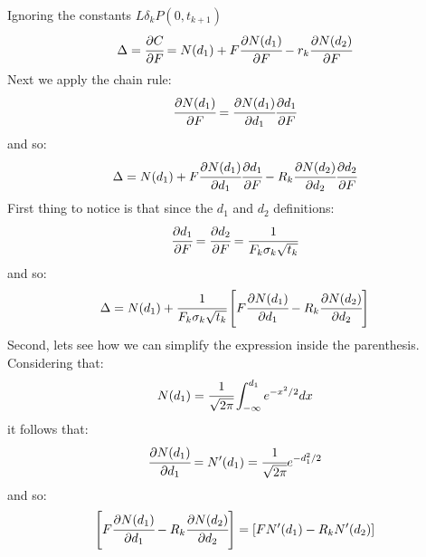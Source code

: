 \documentclass[12pt,a4paper]{exam}
\begin{document}
\begin{questions}
\begin{solution}
	Ignoring the constants $L\delta_k P(0,t_{k+1})$
	\begin{equation*}
		\Delta =\cfrac{\partial C}{\partial F} = N(d_1) + F\cfrac{\partial N(d_1)}{\partial F} - r_k\cfrac{\partial N(d_2)}{\partial F}
	\end{equation*}
	Next we apply the chain rule:
	\begin{equation*}
		\cfrac{\partial N(d_1)}{\partial F} = \cfrac{\partial N(d_1)}{\partial d_1}\cfrac{\partial d_1}{\partial F}
	\end{equation*}
	and so:
	\begin{equation*}
		\Delta = N(d_1) + F\cfrac{\partial N(d_1)}{\partial d_1}\cfrac{\partial d_1}{\partial F} - R_k \cfrac{\partial N(d_2)}{\partial d_2}\cfrac{\partial d_2}{\partial F}
	\end{equation*}
	First thing to notice is that since the $d_1$ and $d_2$ definitions:
	\begin{equation*}
		\cfrac{\partial d_1}{\partial F} = \cfrac{\partial d_2}{\partial F}=\cfrac{1}{F_k\sigma_k\sqrt{t_k}}
	\end{equation*}
	and so:
	\begin{equation*}
		\Delta = N(d_1) + \cfrac{1}{F_k\sigma_k\sqrt{t_k}}\left[F\cfrac{\partial N(d_1)}{\partial d_1} - R_k \cfrac{\partial N(d_2)}{\partial d_2}\right]
	\end{equation*}
	Second, lets see how we can simplify the expression inside the parenthesis. Considering that:
	\begin{equation*}
		N(d_1) = \cfrac{1}{\sqrt{2\pi}}\int_{-\infty}^{d_1} e^{-x^2/2}dx
	\end{equation*}
	it follows that:
	\begin{equation*}
		\cfrac{\partial N(d_1)}{\partial d_1}=N'(d_1)=\cfrac{1}{\sqrt{2\pi}}e^{-d_1^2/2}
	\end{equation*}
	and so:
	\begin{equation*}
		\left[F\cfrac{\partial N(d_1)}{\partial d_1} - R_k \cfrac{\partial N(d_2)}{\partial d_2}\right] = \left[FN'(d_1)-R_kN'(d_2)\right]
	\end{equation*}


\end{solution}
\end{questions}
\end{document}

